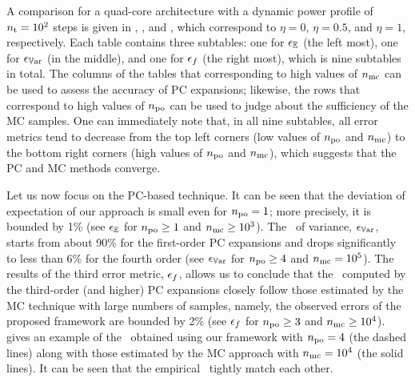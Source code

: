 
A comparison for a quad-core architecture with a dynamic power profile of ${n_\text{t}} = 10^2$ steps is given in , , and , which correspond to $\eta = 0$, $\eta = 0.5$, and $\eta = 1$, respectively.
Each table contains three subtables: one for $\epsilon_\mathbb{E}$ (the left most), one for $\epsilon_{\mathbb{V}\text{ar}}$ (in the middle), and one for $\epsilon_f$ (the right most), which is nine subtables in total.
The columns of the tables that corresponding to high values of ${n_\text{mc}}$ can be used to assess the accuracy of PC expansions; likewise, the rows that correspond to high values of ${n_\text{po}}$ can be used to judge about the sufficiency of the MC samples.
One can immediately note that, in all nine subtables, all error metrics tend to decrease from the top left corners (low values of ${n_\text{po}}$ and ${n_\text{mc}}$) to the bottom right corners (high values of ${n_\text{po}}$ and ${n_\text{mc}}$), which suggests that the PC and MC methods converge.

Let us now focus on the PC-based technique.
It can be seen that the deviation of expectation of our approach is small even for ${n_\text{po}} = 1$; more precisely, it is bounded by 1\% (see $\epsilon_\mathbb{E}$ for ${n_\text{po}} \geq 1$ and ${n_\text{mc}} \geq 10^3$).
The \nrmse\ of variance, $\epsilon_{\mathbb{V}\text{ar}}$, starts from about 90\% for the first-order PC expansions and drops significantly to less than 6\% for the fourth order (see $\epsilon_{\mathbb{V}\text{ar}}$ for ${n_\text{po}} \geq 4$ and ${n_\text{mc}} = 10^5$).
The results of the third error metric, $\epsilon_f$, allows us to conclude that the \pdfs\ computed by the third-order (and higher) PC expansions closely follow those estimated by the MC technique with large numbers of samples, namely, the observed errors of the proposed framework are bounded by 2\% (see $\epsilon_f$ for ${n_\text{po}} \geq 3$ and ${n_\text{mc}} \geq 10^4$).
 gives an example of the \pdf\ obtained using our framework with ${n_\text{po}} = 4$ (the dashed lines) along with those estimated by the MC approach with ${n_\text{mc}} = 10^4$ (the solid lines).
It can be seen that the empirical \pdfs\ tightly match each other.

